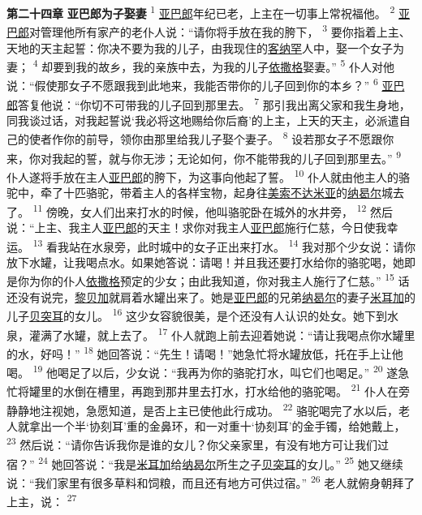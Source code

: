 \textbf{第二十四章 }
\textbf{亚巴郎为子娶妻 }
\textsuperscript{1}
\uline{亚巴郎}年纪已老，上主在一切事上常祝福他。
\textsuperscript{2}
\uline{亚巴郎}对管理他所有家产的老仆人说：“请你将手放在我的胯下，
\textsuperscript{3}
要你指着上主、天地的天主起誓：你决不要为我的儿子，由我现住的\uline{客纳罕}人中，娶一个女子为妻；
\textsuperscript{4}
却要到我的故乡，我的亲族中去，为我的儿子\uline{依撒格}娶妻。”
\textsuperscript{5}
仆人对他说：“假使那女子不愿跟我到此地来，我能否带你的儿子回到你的本乡？”
\textsuperscript{6}
\uline{亚巴郎}答复他说：“你切不可带我的儿子回到那里去。
\textsuperscript{7}
那引我出离父家和我生身地，同我谈过话，对我起誓说‘我必将这地赐给你后裔’的上主，上天的天主，必派遣自己的使者作你的前导，领你由那里给我儿子娶个妻子。
\textsuperscript{8}
设若那女子不愿跟你来，你对我起的誓，就与你无涉；无论如何，你不能带我的儿子回到那里去。”
\textsuperscript{9}
仆人遂将手放在主人\uline{亚巴郎}的胯下，为这事向他起了誓。
\textsuperscript{10}
仆人就由他主人的骆驼中，牵了十匹骆驼，带着主人的各样宝物，起身往\uline{美索不}\uline{达米亚}的\uline{纳曷尔}城去了。
\textsuperscript{11}
傍晚，女人们出来打水的时候，他叫骆驼卧在城外的水井旁，
\textsuperscript{12}
然后说：“上主、我主人\uline{亚巴郎}的天主！求你对我主人\uline{亚巴郎}施行仁慈，今日使我幸运。
\textsuperscript{13}
看我站在水泉旁，此时城中的女子正出来打水。
\textsuperscript{14}
我对那个少女说：请你放下水罐，让我喝点水。如果她答说：请喝！并且我还要打水给你的骆驼喝，她即是你为你的仆人\uline{依撒格}预定的少女；由此我知道，你对我主人施行了仁慈。”
\textsuperscript{15}
话还没有说完，\uline{黎贝加}就肩着水罐出来了。她是\uline{亚巴郎}的兄弟\uline{纳曷尔}的妻子\uline{米耳加}的儿子\uline{贝突耳}的女儿。
\textsuperscript{16}
这少女容貌很美，是个还没有人认识的处女。她下到水泉，灌满了水罐，就上去了。
\textsuperscript{17}
仆人就跑上前去迎着她说：“请让我喝点你水罐里的水，好吗！”
\textsuperscript{18}
她回答说：“先生！请喝！”她急忙将水罐放低，托在手上让他喝。
\textsuperscript{19}
他喝足了以后，少女说：“我再为你的骆驼打水，叫它们也喝足。”
\textsuperscript{20}
遂急忙将罐里的水倒在槽里，再跑到那井里去打水，打水给他的骆驼喝。
\textsuperscript{21}
仆人在旁静静地注视她，急愿知道，是否上主已使他此行成功。
\textsuperscript{22}
骆驼喝完了水以后，老人就拿出一个半‘协刻耳’重的金鼻环，和一对重十‘协刻耳’的金手镯，给她戴上，
\textsuperscript{23}
然后说：“请你告诉我你是谁的女儿？你父亲家里，有没有地方可让我们过宿？”
\textsuperscript{24}
她回答说：“我是\uline{米耳加}给\uline{纳曷尔}所生之子\uline{贝突耳}的女儿。”
\textsuperscript{25}
她又继续说：“我们家里有很多草料和饲粮，而且还有地方可供过宿。”
\textsuperscript{26}
老人就俯身朝拜了上主，说：
\textsuperscript{27}
